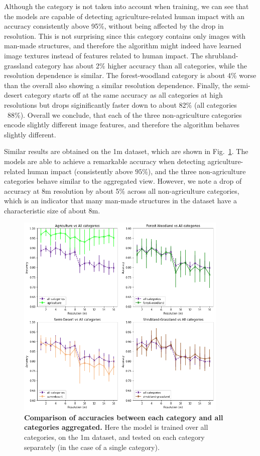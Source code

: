 Although the category is not taken into account when training, we can see that the models are capable of detecting agriculture-related human impact with an accuracy consistently above 95\%, without being affected by the drop in resolution. This is not surprising since this category contains only images with man-made structures, and therefore the algorithm might indeed have learned image textures instead of features related to human impact.
The shrubland-grassland category has about 2\% higher accuracy than all categories, while the resolution dependence is similar. The forest-woodland category is  about 4\% worse than the overall also showing a similar resolution dependence. Finally, the semi-desert category starts off at the same accuracy as all categories at high resolutions but drops siginificantly faster down to about 82\% (all categories ~88\%). Overall we conclude, that each of the three non-agriculture categories encode slightly different image features, and therefore the algorithm behaves slightly different.

Similar results are obtained on the 1m dataset, which are shown in Fig.~\ref{fig:acc_by_cat_1m}. The models are able to achieve a remarkable accuracy when detecting agriculture-related human impact (consistently above $95\%$), and the three non-agriculture categories behave similar to the aggregated view. However, we note a drop of accuracy at 8m resolution by about 5\% across all non-agriculture categories, which is an indicator that many man-made structures in the dataset have a characteristic size of  about 8m.

\begin{figure}[H]
	\centering
	\includegraphics[width=0.9\textwidth]{Figures/results/acc_res_by_category_1m.png}
	\captionsetup{width=1\linewidth}
	\caption{\textbf{Comparison of accuracies between each category and all categories aggregated.} Here the model is trained over all categories, on the 1m dataset, and tested on each category separately (in the case of a single category).}
	\label{fig:acc_by_cat_1m}
\end{figure}


